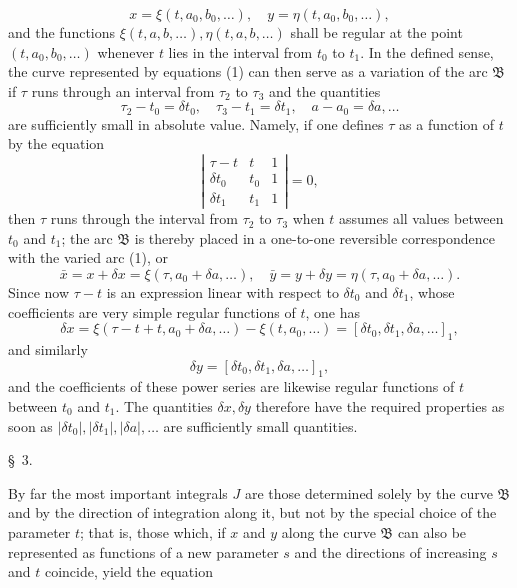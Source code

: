 \documentclass[11pt,a4paper,leqno]{article}
\begin{document}
\[
 x=\xi(t,a_0,b_0,\ldots),\quad y=\eta(t,a_0,b_0,\ldots),
\]
and the functions $\xi(t,a,b,\ldots),\eta(t,a,b,\ldots)$ shall be regular at the point $(t,a_0,b_0,\ldots)$ whenever $t$ lies in the interval from $t_0$ to $t_1$. In the defined sense, the curve represented by equations (1) can then serve as a variation of the arc $\mathfrak{B}$ if $\tau$ runs through an interval from $\tau_2$ to $\tau_3$ and the quantities
\[
 \tau_2-t_0=\delta t_0,\quad \tau_3-t_1=\delta t_1,\quad a-a_0=\delta a,\ldots
\]
are sufficiently small in absolute value. Namely, if one defines $\tau$ as a function of $t$ by the equation
\[
 \left|\begin{array}{ccc}
 \tau-t & t & 1\\
 \delta t_0 & t_0 & 1\\
 \delta t_1 & t_1 & 1
 \end{array}\right|=0,
\]
then $\tau$ runs through the interval from $\tau_2$ to $\tau_3$ when $t$ assumes all values between $t_0$ and $t_1$; the arc $\mathfrak{B}$ is thereby placed in a one-to-one reversible correspondence with the varied arc (1), or
\[
 \bar{x}=x+\delta x=\xi(\tau,a_0+\delta a,\ldots),\quad
 \bar{y}=y+\delta y=\eta(\tau,a_0+\delta a,\ldots).
\]
Since now $\tau-t$ is an expression linear with respect to $\delta t_0$ and $\delta t_1$, whose coefficients are very simple regular functions of $t$, one has
\[
 \delta x=\xi(\tau-t+t,a_0+\delta a,\ldots)-\xi(t,a_0,\ldots)=[\delta t_0,\delta t_1,\delta a,\ldots]_1,
\]
and similarly
\[
 \delta y=[\delta t_0,\delta t_1,\delta a,\ldots]_1,
\]
and the coefficients of these power series are likewise regular functions of $t$ between $t_0$ and $t_1$. The quantities $\delta x,\delta y$ therefore have the required properties as soon as $|\delta t_0|,|\delta t_1|,|\delta a|,\ldots$ are sufficiently small quantities.

\begin{center}{\large \S~3.}\end{center}

By far the most important integrals $J$ are those determined solely by the curve $\mathfrak{B}$ and by the direction of integration along it, but not by the special choice of the parameter $t$; that is, those which, if $x$ and $y$ along the curve $\mathfrak{B}$ can also be represented as functions of a new parameter $s$ and the directions of increasing $s$ and $t$ coincide, yield the equation
\end{document}
